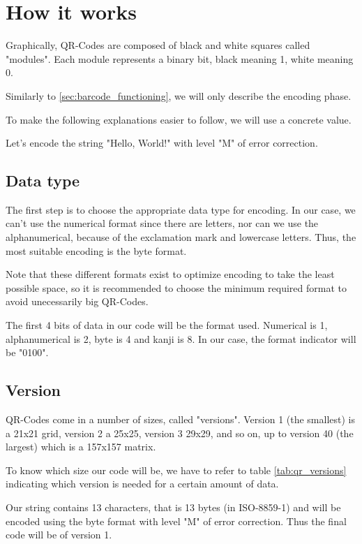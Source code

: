 \section{How it works}
\label{sec:qr_functioning}

Graphically, QR-Codes are composed of black and white squares called "modules". Each module represents a binary bit, black meaning 1, white meaning 0.

Similarly to \autoref{sec:barcode_functioning}, we will only describe the encoding phase.

To make the following explanations easier to follow, we will use a concrete value.

Let's encode the string "Hello, World!" with level "M" of error correction.

\subsection{Data type}
\label{ssec:qr_data_type}

The first step is to choose the appropriate data type for encoding. In our case, we can't use the numerical format since there are letters, nor can we use the alphanumerical, because of the exclamation mark and lowercase letters. Thus, the most suitable encoding is the byte format.

Note that these different formats exist to optimize encoding to take the least possible space, so it is recommended to choose the minimum required format to avoid unecessarily big QR-Codes.

The first 4 bits of data in our code will be the format used. Numerical is 1, alphanumerical is 2, byte is 4 and kanji is 8. In our case, the format indicator will be "0100".

\subsection{Version}
\label{ssec:qr_version}

QR-Codes come in a number of sizes, called "versions". Version 1 (the smallest) is a 21x21 grid, version 2 a 25x25, version 3 29x29, and so on, up to version 40 (the largest) which is a 157x157 matrix.

To know which size our code will be, we have to refer to table \ref{tab:qr_versions} indicating which version is needed for a certain amount of data.

Our string contains 13 characters, that is 13 bytes (in ISO-8859-1) and will be encoded using the byte format with level "M" of error correction. Thus the final code will be of version 1.


